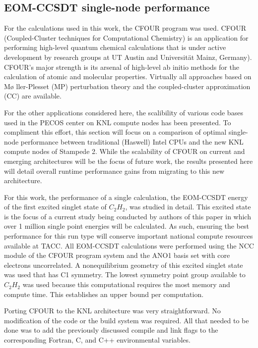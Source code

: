 \subsection{EOM-CCSDT single-node performance}
\label{sec:cfour}

For the calculations used in this work,
the CFOUR \cite{cfour:08} program was used. CFOUR
(Coupled-Cluster techniques for Computational Chemistry) is an
application for performing high-level quantum chemical calculations
that is under active development by research groups at UT Austin and
Universit\"{a}t Mainz, Germany). CFOUR's major strength is its arsenal
of high-level ab initio methods for the calculation of atomic and
molecular properties.  Virtually all approaches based on M\o
ller-Plesset (MP) perturbation theory and the coupled-cluster
approximation (CC) are available.

For the other applications considered here, the scalibility of various code bases 
used in the PECOS center on KNL compute nodes has been presented. To compliment
this effort, this section will focus on a comparison of optimal single-node performance
between traditional (Haswell) Intel CPUs and the new KNL compute nodes of Stampede 2.
While the scalability of CFOUR on current and emerging architectures will be the focus 
of future work, the results presented here will detail overall runtime performance gains
from migrating to this new architecture. 

For this work, the performance of a single calculation, the EOM-CCSDT energy of the first
excited singlet state of $C_2H_2$, was studied in detail. This excited state is the focus
of a current study being conducted by authors of this paper in which over 1 million single point
energies will be calculated. As such, ensuring the best performance for this run type will conserve
important national compute resources available at TACC. All EOM-CCSDT calculations were performed 
using the NCC module \cite{ncc:15} of the CFOUR program system 
and the ANO1 basis set \cite{ano1:87} with core electrons uncorrelated. A nonequilibrium geometry
of this excited singlet state was used that has C1 symmetry. The lowest symmetry point group available to 
$C_2H_2$ was used because this computational requires the most memory and compute time. This establishes
an upper bound per computation.

Porting CFOUR to the KNL architecture was very straightforward. No modification of the code or the build
system was required. All that needed to be done was to add the previously discussed compile and link flags
to the corresponding Fortran, C, and C++ environmental variables.

